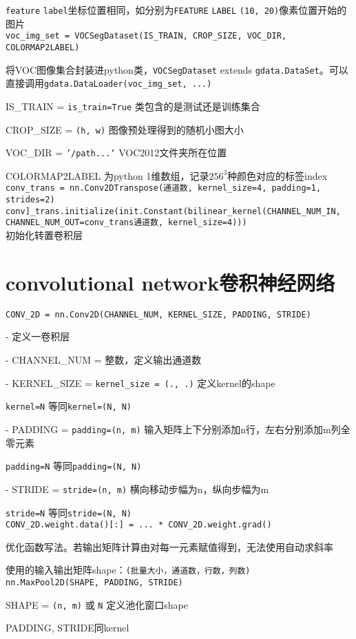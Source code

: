 \documentclass[UTF8]{ctexart}
\begin{document}
  \texttt{feature} \texttt{label}坐标位置相同，如分别为\texttt{FEATURE} \texttt{LABEL} \texttt{(10, 20)}像素位置开始的图片\\
\texttt{voc\_img\_set = VOCSegDataset(IS\_TRAIN, CROP\_SIZE, VOC\_DIR, COLORMAP2LABEL)}

  将VOC图像集合封装进python类，\texttt{VOCSegDataset} extends \texttt{gdata.DataSet}。可以直接调用\texttt{gdata.DataLoader(voc\_img\_set, ...)}

  IS\_TRAIN = \texttt{is\_train=True} 类包含的是测试还是训练集合

  CROP\_SIZE = \texttt{(h, w)} 图像预处理得到的随机小图大小

  VOC\_DIR = \texttt{'/path...'} VOC2012文件夹所在位置

  COLORMAP2LABEL 为python 1维数组，记录$256^3$种颜色对应的标签index\\
\texttt{conv\_trans = nn.Conv2DTranspose(通道数, kernel\_size=4, padding=1, strides=2)}\\
\texttt{conv]\_trans.initialize(init.Constant(bilinear\_kernel(CHANNEL_NUM_IN, CHANNEL_NUM_OUT=conv\_trans通道数, kernel\_size=4)))}\\

  初始化转置卷积层
\section{convolutional network卷积神经网络}
\noindent \texttt{CONV\_2D = nn.Conv2D(CHANNEL\_NUM, KERNEL\_SIZE, PADDING, STRIDE)}

  - 定义一卷积层

  - CHANNEL\_NUM = 整数，定义输出通道数

  - KERNEL\_SIZE = \texttt{kernel\_size = (., .)} 定义kernel的shape

  \quad \texttt{kernel=N} 等同\texttt{kernel=(N, N)}
  
  - PADDING = \texttt{padding=(n, m)}  输入矩阵上下分别添加n行，左右分别添加m列全零元素

  \quad \texttt{padding=N} 等同\texttt{padding=(N, N)}
  
  - STRIDE = \texttt{stride=(n, m)} 横向移动步幅为n，纵向步幅为m
  
  \quad \texttt{stride=N} 等同\texttt{stride=(N, N)}\\
\texttt{CONV\_2D.weight.data()[:] = ... * CONV\_2D.weight.grad()}

  优化函数写法。若输出矩阵计算由对每一元素赋值得到，无法使用自动求斜率
  
  使用的输入输出矩阵shape：\texttt{(批量大小，通道数，行数，列数)}\\
\texttt{nn.MaxPool2D(SHAPE, PADDING, STRIDE)}

  SHAPE = \texttt{(n, m)} 或 \texttt{N} 定义池化窗口shape

  PADDING, STRIDE同kernel
\end{document}
